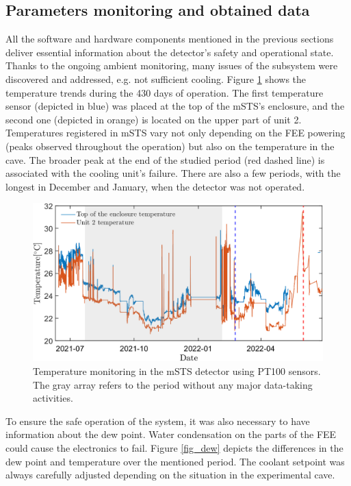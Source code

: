 \subsection{Parameters monitoring and obtained data}
All the software and hardware components mentioned in the previous sections deliver essential information about the detector's safety and operational state. Thanks to the ongoing ambient monitoring, many issues of the subsystem were discovered and addressed, e.g. not sufficient cooling. Figure \ref{fig_temp} shows the temperature trends during the 430 days of operation. The first temperature sensor (depicted in blue) was placed at the top of the \gls{mSTS}'s enclosure, and the second one (depicted in orange) is located on the upper part of unit 2. Temperatures registered in \gls{mSTS} vary not only depending on the \gls{FEE} powering (peaks observed throughout the operation) but also on the temperature in the cave. The broader peak at the end of the studied period (red dashed line) is associated with the cooling unit's failure. There are also a few periods, with the longest in December and January, when the detector was not operated. 

\begin{figure}[!h]
\centering
\includegraphics[width=0.9\columnwidth]{Chapter6/DCS/images/temp2.png}
\caption{Temperature monitoring in the \gls{mSTS} detector using PT100 sensors. The gray array refers to the period without any major data-taking activities.}
\label{fig_temp}
\end{figure}
\newpage
To ensure the safe operation of the system, it was also necessary to have information about the dew point. Water condensation on the parts of the \gls{FEE} could cause the electronics to fail. Figure \ref{fig_dew} depicts the differences in the dew point and temperature over the mentioned period. The coolant setpoint was always carefully adjusted depending on the situation in the experimental cave. 

